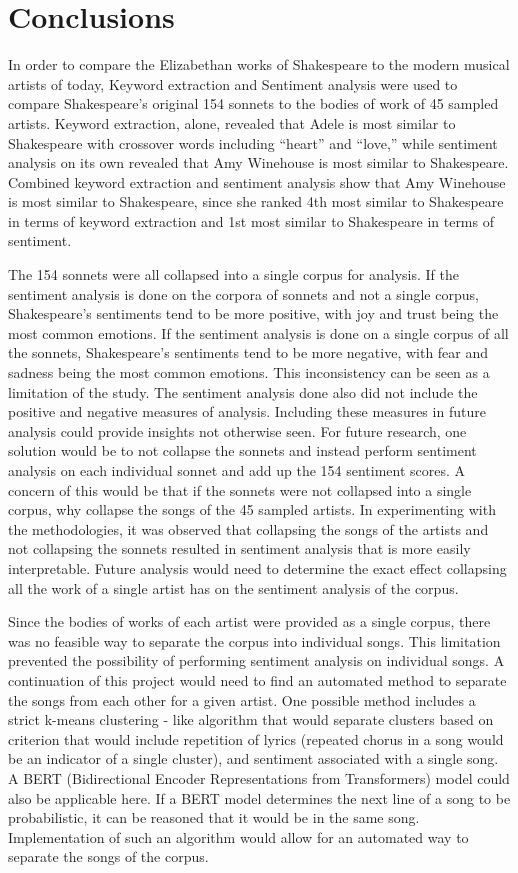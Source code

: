 \documentclass[10pt,a4paper]{article}
\begin{document}
\section{Conclusions}
In order to compare the Elizabethan works of Shakespeare to the modern musical artists of today, Keyword extraction and Sentiment analysis were used to compare Shakespeare’s original 154 sonnets to the bodies of work of 45 sampled artists. Keyword extraction, alone, revealed that Adele is most similar to Shakespeare with crossover words including “heart” and “love,” while sentiment analysis on its own revealed that Amy Winehouse is most similar to Shakespeare. Combined keyword extraction and sentiment analysis show that Amy Winehouse is most similar to Shakespeare, since she ranked 4th most similar to Shakespeare in terms of keyword extraction and 1st most similar to Shakespeare in terms of sentiment. 

\noindent The 154 sonnets were all collapsed into a single corpus for analysis. If the sentiment analysis is done on the corpora of sonnets and not a single corpus, Shakespeare’s sentiments tend to be more positive, with joy and trust being the most common emotions. If the sentiment analysis is done on a single corpus of all the sonnets, Shakespeare’s sentiments tend to be more negative, with fear and sadness being the most common emotions. This inconsistency can be seen as a limitation of the study. The sentiment analysis done also did not include the positive and negative measures of analysis. Including these measures in future analysis could provide insights not otherwise seen. For future research, one solution would be to not collapse the sonnets and instead perform sentiment analysis on each individual sonnet and add up the 154 sentiment scores. A concern of this would be that if the sonnets were not collapsed into a single corpus, why collapse the songs of the 45 sampled artists. In experimenting with the methodologies, it was observed that collapsing the songs of the artists and not collapsing the sonnets resulted in sentiment analysis that is more easily interpretable. Future analysis would need to determine the exact effect collapsing all the work of a single artist has on the sentiment analysis of the corpus. 

\noindent Since the bodies of works of each artist were provided as a single corpus, there was no feasible way to separate the corpus into individual songs. This limitation prevented the possibility of performing sentiment analysis on individual songs. A continuation of this project would need to find an automated method to separate the songs from each other for a given artist. One possible method includes a strict k-means clustering - like algorithm that would separate clusters based on criterion that would include repetition of lyrics (repeated chorus in a song would be an indicator of a single cluster), and sentiment associated with a single song. A BERT (Bidirectional Encoder Representations from Transformers) model could also be applicable here. If a BERT model determines the next line of a song to be probabilistic, it can be reasoned that it would be in the same song. Implementation of such an algorithm would allow for an automated way to separate the songs of the corpus.
\end{document}
